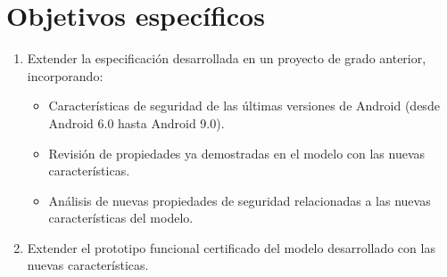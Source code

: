 \section{Objetivos específicos}
\begin{enumerate}
    \item Extender la especificación desarrollada en un proyecto de grado
          anterior, incorporando:
          \label{item:especificacion-coq}
          \begin{itemize}
              \item Características de seguridad de las últimas versiones de
                    Android (desde Android 6.0 hasta Android 9.0).
              \item Revisión de propiedades ya demostradas en el modelo con las
                    nuevas características.
              \item Análisis de nuevas propiedades de seguridad relacionadas a
                    las nuevas características del modelo.
          \end{itemize}
    \item Extender el prototipo funcional certificado del modelo desarrollado
          con las nuevas características.
          \label{item:prototipo}
\end{enumerate}